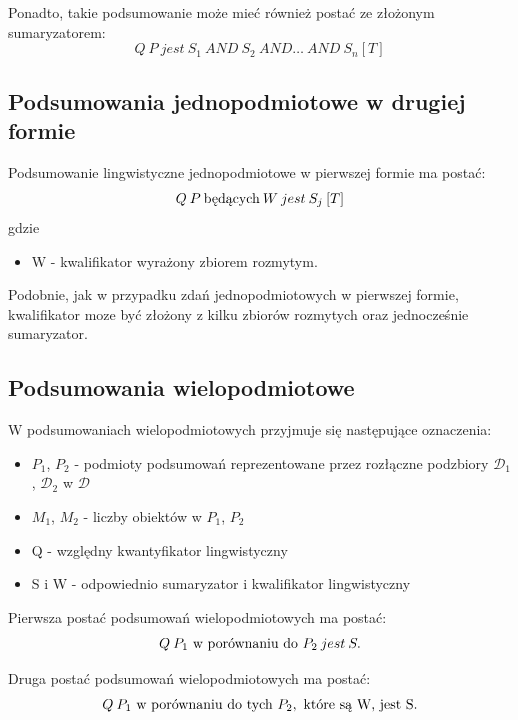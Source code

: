 \documentclass{classrep}
\begin{document}
	Ponadto, takie podsumowanie może mieć również postać ze złożonym sumaryzatorem:
	\begin{equation}
	Q\:P\:jest\:S_1\:AND\:S_2\:AND\ldots\:AND\:S_n[T]
	\end{equation}
	
	\subsection{Podsumowania jednopodmiotowe w drugiej formie \cite{anbook}}	
	Podsumowanie lingwistyczne jednopodmiotowe w pierwszej formie ma postać:
	\begin{equation}
	Q \: P \: \hbox{będących} \: W \: jest\:S_j\:[T]
	\end{equation}
	gdzie
	\begin{itemize}
		\item W - kwalifikator wyrażony zbiorem rozmytym.
	\end{itemize}

	Podobnie, jak w przypadku zdań jednopodmiotowych w pierwszej formie, kwalifikator moze być złożony z kilku zbiorów rozmytych oraz jednocześnie sumaryzator.
	\subsection{Podsumowania wielopodmiotowe \cite{anbookpl}}
	W podsumowaniach wielopodmiotowych przyjmuje się następujące oznaczenia:
	\begin{itemize}
		\item $P_1$, $P_2$ - podmioty podsumowań reprezentowane przez rozłączne podzbiory $\mathcal{D}_1$, $\mathcal{D}_2$ w $\mathcal{D}$
		\item $M_1$, $M_2$ - liczby obiektów w $P_1$, $P_2$
		\item Q - względny kwantyfikator lingwistyczny
		\item S i W - odpowiednio sumaryzator i kwalifikator lingwistyczny 
	\end{itemize} 
	
	Pierwsza postać podsumowań wielopodmiotowych ma postać:
	\begin{equation}
	Q \: P_1 \hbox{ w porównaniu do }P_2 \: jest\:S.
	\end{equation}
    
	Druga postać podsumowań wielopodmiotowych ma postać:
	\begin{equation}
	Q \: P_1 \hbox{ w porównaniu do tych } P_2,\hbox{ które są W, jest S.}
	\end{equation}
\end{document}
